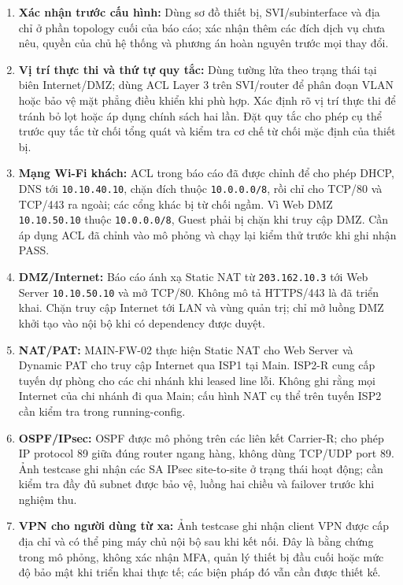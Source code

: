 \begin{enumerate}
    \item \textbf{Xác nhận trước cấu hình:} Dùng sơ đồ thiết bị, SVI/subinterface và địa chỉ ở phần topology cuối của báo cáo; xác nhận thêm các đích dịch vụ chưa nêu, quyền của chủ hệ thống và phương án hoàn nguyên trước mọi thay đổi.
    \item \textbf{Vị trí thực thi và thứ tự quy tắc:} Dùng tường lửa theo trạng thái tại biên Internet/DMZ; dùng ACL Layer 3 trên SVI/router để phân đoạn VLAN hoặc bảo vệ mặt phẳng điều khiển khi phù hợp. Xác định rõ vị trí thực thi để tránh bỏ lọt hoặc áp dụng chính sách hai lần. Đặt quy tắc cho phép cụ thể trước quy tắc từ chối tổng quát và kiểm tra cơ chế từ chối mặc định của thiết bị.
    \item \textbf{Mạng Wi-Fi khách:} ACL trong báo cáo đã được chỉnh để cho phép DHCP, DNS tới \texttt{10.10.40.10}, chặn đích thuộc \texttt{10.0.0.0/8}, rồi chỉ cho TCP/80 và TCP/443 ra ngoài; các cổng khác bị từ chối ngầm. Vì Web DMZ \texttt{10.10.50.10} thuộc \texttt{10.0.0.0/8}, Guest phải bị chặn khi truy cập DMZ. Cần áp dụng ACL đã chỉnh vào mô phỏng và chạy lại kiểm thử trước khi ghi nhận PASS.
    \item \textbf{DMZ/Internet:} Báo cáo ánh xạ Static NAT từ \texttt{203.162.10.3} tới Web Server \texttt{10.10.50.10} và mở TCP/80. Không mô tả HTTPS/443 là đã triển khai. Chặn truy cập Internet tới LAN và vùng quản trị; chỉ mở luồng DMZ khởi tạo vào nội bộ khi có dependency được duyệt.
    \item \textbf{NAT/PAT:} MAIN-FW-02 thực hiện Static NAT cho Web Server và Dynamic PAT cho truy cập Internet qua ISP1 tại Main. ISP2-R cung cấp tuyến dự phòng cho các chi nhánh khi leased line lỗi. Không ghi rằng mọi Internet của chi nhánh đi qua Main; cấu hình NAT cụ thể trên tuyến ISP2 cần kiểm tra trong running-config.
    \item \textbf{OSPF/IPsec:} OSPF được mô phỏng trên các liên kết Carrier-R; cho phép IP protocol 89 giữa đúng router ngang hàng, không dùng TCP/UDP port 89. Ảnh testcase ghi nhận các SA IPsec site-to-site ở trạng thái hoạt động; cần kiểm tra đầy đủ subnet được bảo vệ, luồng hai chiều và failover trước khi nghiệm thu.
    \item \textbf{VPN cho người dùng từ xa:} Ảnh testcase ghi nhận client VPN được cấp địa chỉ và có thể ping máy chủ nội bộ sau khi kết nối. Đây là bằng chứng trong mô phỏng, không xác nhận MFA, quản lý thiết bị đầu cuối hoặc mức độ bảo mật khi triển khai thực tế; các biện pháp đó vẫn cần được thiết kế.

\end{enumerate}
